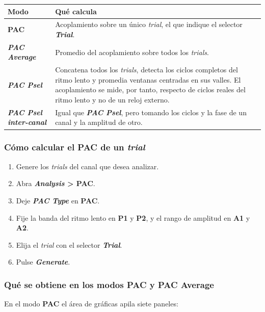 \documentclass[11pt,a4paper]{article}
\begin{document}
    \begin{center}
    \small
    \begin{tabularx}{\textwidth}{|p{}|X|}
    \hline
    \textbf{Modo} & \textbf{Qu\'e calcula} \\
    \hline
    \textbf{PAC} & Acoplamiento sobre un \'unico \textit{trial}, el que indique el selector \textbf{\textit{Trial}}. \\
    \hline
    \textbf{\textit{PAC Average}} & Promedio del acoplamiento sobre todos los \textit{trials}. \\
    \hline
    \textbf{\textit{PAC Psel}} & Concatena todos los \textit{trials}, detecta los ciclos completos del ritmo lento y promedia ventanas centradas en sus valles. El acoplamiento se mide, por tanto, respecto de ciclos reales del ritmo lento y no de un reloj externo. \\
    \hline
    \textbf{\textit{PAC Psel inter-canal}} & Igual que \textbf{\textit{PAC Psel}}, pero tomando los ciclos y la fase de un canal y la amplitud de otro. \\
    \hline
    \end{tabularx}
    \label{tab:mu_pac_modos}
    \end{center}

    \subsubsection*{C\'omo calcular el PAC de un \textit{trial}}
    \begin{enumerate}
        \item Genere los \textit{trials} del canal que desea analizar.
        \item Abra \textbf{\textit{Analysis} > PAC}.
        \item Deje \textbf{\textit{PAC Type}} en \textbf{PAC}.
        \item Fije la banda del ritmo lento en \textbf{P1} y \textbf{P2}, y el rango de amplitud en \textbf{A1} y \textbf{A2}.
        \item Elija el \textit{trial} con el selector \textbf{\textit{Trial}}.
        \item Pulse \textbf{\textit{Generate}}.
    \end{enumerate}

    \subsubsection*{Qu\'e se obtiene en los modos PAC y PAC Average}
    En el modo \textbf{PAC} el \'area de gr\'aficas apila siete paneles:
\end{document}

